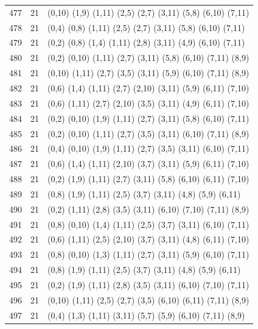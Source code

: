 \begin{appendix}
{\begin{longtable}{lll}
    477& 21 & (0,10)  (1,9)   (1,11)  (2,5)   (2,7)   (3,11)  (5,8)   (6,10)  (7,11)\\
    478& 21 & (0,4)   (0,8)   (1,11)  (2,5)   (2,7)   (3,11)  (5,8)   (6,10)  (7,11)\\
    479& 21 & (0,2)   (0,8)   (1,4)   (1,11)  (2,8)   (3,11)  (4,9)   (6,10)  (7,11)\\
    480& 21 & (0,2)   (0,10)  (1,11)  (2,7)   (3,11)  (5,8)   (6,10)  (7,11)  (8,9)\\
    481& 21 & (0,10)  (1,11)  (2,7)   (3,5)   (3,11)  (5,9)   (6,10)  (7,11)  (8,9)\\
    482& 21 & (0,6)   (1,4)   (1,11)  (2,7)   (2,10)  (3,11)  (5,9)   (6,11)  (7,10)\\
    483& 21 & (0,6)   (1,11)  (2,7)   (2,10)  (3,5)   (3,11)  (4,9)   (6,11)  (7,10)\\
    484& 21 & (0,2)   (0,10)  (1,9)   (1,11)  (2,7)   (3,11)  (5,8)   (6,10)  (7,11)\\
    485& 21 & (0,2)   (0,10)  (1,11)  (2,7)   (3,5)   (3,11)  (6,10)  (7,11)  (8,9)\\
    486& 21 & (0,4)   (0,10)  (1,9)   (1,11)  (2,7)   (3,5)   (3,11)  (6,10)  (7,11)\\
    487& 21 & (0,6)   (1,4)   (1,11)  (2,10)  (3,7)   (3,11)  (5,9)   (6,11)  (7,10)\\
    488& 21 & (0,2)   (1,9)   (1,11)  (2,7)   (3,11)  (5,8)   (6,10)  (6,11)  (7,10)\\
    489& 21 & (0,8)   (1,9)   (1,11)  (2,5)   (3,7)   (3,11)  (4,8)   (5,9)   (6,11)\\
    490& 21 & (0,2)   (1,11)  (2,8)   (3,5)   (3,11)  (6,10)  (7,10)  (7,11)  (8,9)\\
    491& 21 & (0,8)   (0,10)  (1,4)   (1,11)  (2,5)   (3,7)   (3,11)  (6,10)  (7,11)\\
    492& 21 & (0,6)   (1,11)  (2,5)   (2,10)  (3,7)   (3,11)  (4,8)   (6,11)  (7,10)\\
    493& 21 & (0,8)   (0,10)  (1,3)   (1,11)  (2,7)   (3,11)  (5,9)   (6,10)  (7,11)\\
    494& 21 & (0,8)   (1,9)   (1,11)  (2,5)   (3,7)   (3,11)  (4,8)   (5,9)   (6,11)\\
    495& 21 & (0,2)   (1,9)   (1,11)  (2,8)   (3,5)   (3,11)  (6,10)  (7,10)  (7,11)\\
    496& 21 & (0,10)  (1,11)  (2,5)   (2,7)   (3,5)   (6,10)  (6,11)  (7,11)  (8,9)\\
    497& 21 & (0,4)   (1,3)   (1,11)  (3,11)  (5,7)   (5,9)   (6,10)  (7,11)  (8,9)\\

\end{longtable}}
\end{appendix}
